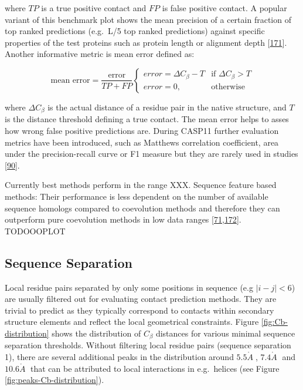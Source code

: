 \documentclass[11pt,a4paper,twoside]{book}
\newcommand{\Cb}{C_\beta}
\newcommand{\angstrom}{\mathring{A} \;}
\theoremstyle{definition}
\theoremstyle{definition}
\theoremstyle{remark}
\begin{document}
where \(TP\) is a true positive contact and \(FP\) is false positive
contact. A popular variant of this benchmark plot shows the mean
precision of a certain fraction of top ranked predictions (e.g.~L/5 top
ranked predictions) against specific properties of the test proteins
such as protein length or alignment depth
{[}\protect\hyperlink{ref-Ashkenazy2009}{171}{]}. Another informative
metric is mean error defined as:

\begin{equation}
    \textrm{mean error}  = \frac{\textrm{error}}{TP + FP} 
        \begin{cases}
            error = \Delta\Cb - T & \text{if } \Delta\Cb > T\\
            error = 0, &\text{otherwise }
        \end{cases}
\end{equation}

where \(\Delta\Cb\) is the actual distance of a residue pair in the
native structure, and \(T\) is the distance threshold defining a true
contact. The mean error helps to asses how wrong false positive
predictions are. During CASP11 further evaluation metrics have been
introduced, such as Matthews correlation coefficient, area under the
precision-recall curve or F1 measure but they are rarely used in studies
{[}\protect\hyperlink{ref-Monastyrskyy2015}{90}{]}.

Currently best methods perform in the range XXX. Sequence feature based
methods: Their performance is less dependent on the number of available
sequence homologs compared to coevolution methods and therefore they can
outperform pure coevolution methods in low data ranges
{[}\protect\hyperlink{ref-Wang2013}{71},\protect\hyperlink{ref-Kosciolek2015a}{172}{]}.
TODOOOPLOT

\subsection{Sequence Separation}\label{seq-sep}

Local residue pairs separated by only some positions in sequence (e.g
\(|i-j| < 6\)) are usually filtered out for evaluating contact
prediction methods. They are trivial to predict as they typically
correspond to contacts within secondary structure elements and reflect
the local geometrical constraints. Figure \ref{fig:Cb-distribution}
shows the distribution of \(\Cb\) distances for various minimal sequence
separation thresholds. Without filtering local residue pairs (sequence
separation 1), there are several additional peaks in the distribution
around \(5.5\angstrom\), \(7.4\angstrom\) and \(10.6\angstrom\) that can
be attributed to local interactions in e.g.~helices (see Figure
\ref{fig:peaks-Cb-distribution}).
\end{document}
